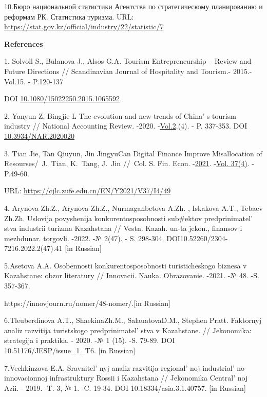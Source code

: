 10.Бюро национальной статистики Агентства по стратегическому
планированию и реформам РК. Статистика туризма. URL:
\url{https://stat.gov.kz/official/industry/22/statistic/7}

{\bfseries References}

1. Solvoll S., Bulanova J., Alsos G.A. Tourism Entrepreneurship --
Review and Future Directions // Scandinavian Journal of Hospitality and
Tourism.- 2015.- Vol.15. - P.120-137

DOI
\href{http://dx.doi.org/10.1080/15022250.2015.1065592}{10.1080/15022250.2015.1065592}

2. Yanyun Z, Bingjie L The evolution and new trends of
China' s tourism industry // National Accounting Review.
-2020.
-\href{https://www.aimspress.com/nar/article/archives}{Vol.2}.(4). - P.
337-353. DOI
\href{https://doi.org/10.3934/NAR.2020020}{10.3934/NAR.2020020}

3. Tian Jie, Tan Qiuyun, Jin JingyuCan Digital Finance Improve
Misallocation of Resourses/~J.~Tian, K.~Tang, J.~Jin //~Col. S. Fin.
Econ.
-\href{https://cjlc.zufe.edu.cn/EN/article/showTenYearVolumnDetail.do?nian=2021}{2021}.
-\href{https://cjlc.zufe.edu.cn/EN/article/showTenYearVolumnDetail.do?nian=2021}{Vol.
37}\href{file:///C:/Users/admin/Desktop/Вестник\%20КазУТБ/4\%202024/(4)}{(4)}.
- P.49-60.

URL: \url{https://cjlc.zufe.edu.cn/EN/Y2021/V37/I4/49}

4. Arynova Zh.Z., Arynova Zh.Z., Nurmaganbetova A.Zh. , Iskakova A.T.,
Tebaev Zh.Zh. Uslovija povyshenija konkurentosposobnosti sub\#ektov
predprinimatel' stva industrii turizma Kazahstana //
Vestn. Kazah. un-ta jekon., finansov i mezhdunar. torgovli. -2022. -№
2(47). - S. 298-304. DOI10.52260/2304-7216.2022.2(47).41 {[}in
Russian{]}

5.Asetova A.A. Osobennosti konkurentosposobnosti turisticheskogo biznesa
v Kazahstane: obzor literatury // Innovacii. Nauka. Obrazovanie. -2021.
-№ 48. -S. 357-367.

https://innovjourn.ru/nomer/48-nomer/.{[}in Russian{]}

6.Tleuberdinova A.T., ShaekinaZh.M., SalauatovaD.M., Stephen Pratt.
Faktornyj analiz razvitija turistskogo
predprinimatel' stva v Kazahstane. // Jekonomika:
strategija i praktika. - 2020. -№ 1 (15). -S. 79-89. DOI
10.51176/JESP/issue\_1\_T6. {[}in Russian{]}

7.Vechkinzova E.A. Sravnitel' nyj analiz razvitija
regional' noj industrial' no-innovacionnoj
infrastruktury Rossii i Kazahstana // Jekonomika
Central' noj Azii. - 2019. -T. 3,-№ 1. -C. 19-34. DOI
10.18334/asia.3.1.40757. {[}in Russian{]}

